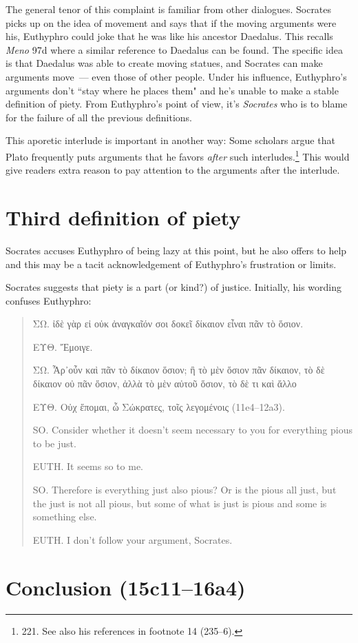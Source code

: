 \documentclass[11pt]{article}
\begin{document}
The general tenor of this complaint is familiar from other dialogues.
Socrates picks up on the idea of movement and says that if the moving
arguments were his, Euthyphro could joke that he was like his ancestor
Daedalus.  This recalls \emph{Meno} 97d where a similar reference to
Daedalus can be found.  The specific idea is that Daedalus was able to
create moving statues, and Socrates can make arguments move~--- even those
of other people.  Under his influence, Euthyphro's arguments don't ``stay
where he places them" and he's unable to make a stable definition of piety.
From Euthyphro's point of view, it's \emph{Socrates} who is to blame for
the failure of all the previous definitions.

This aporetic interlude is important in another way: Some scholars argue
that Plato frequently puts arguments that he favors \emph{after} such
interludes.\footnote{\citet{mcpherran1992} 221.  See also his references
in footnote 14 (235--6).}  This would give readers extra reason to pay
attention to the arguments after the interlude.

\section{Third definition of piety}

Socrates accuses Euthyphro of being lazy at this point, but he also
offers to help and this may be a tacit acknowledgement of Euthyphro's
frustration or limits.

Socrates suggests that piety is a part (or kind?) of justice. Initially,
his wording confuses Euthyphro:

\begin{quote}
    ΣΩ. ἰδὲ γὰρ εἰ οὐκ ἀναγκαῖόν σοι δοκεῖ δίκαιον εἶναι πᾶν τὸ ὅσιον.

    ΕΥΘ. Ἔμοιγε.

    ΣΩ. Ἆρ᾽οὖν καὶ πᾶν τὸ δίκαιον ὅσιον; ἢ τὸ μὲν ὅσιον πᾶν δίκαιον, τὸ δὲ
    δίκαιον οὐ πᾶν ὅσιον, ἀλλὰ τὸ μὲν αὐτοῦ ὅσιον, τὸ δὲ τι καὶ ἄλλο

    ΕΥΘ. Οὐχ ἕπομαι, ὦ Σώκρατες, τοῖς λεγομένοις (11e4--12a3).

    SO. Consider whether it doesn't seem necessary to you for everything
    pious to be just.

    EUTH. It seems so to me.

    SO. Therefore is everything just also pious? Or is the pious all just,
    but the just is not all pious, but some of what is just is pious and
    some is something else.

    EUTH. I don't follow your argument, Socrates.
\end{quote}

\section{Conclusion (15c11--16a4)}



\end{document}
